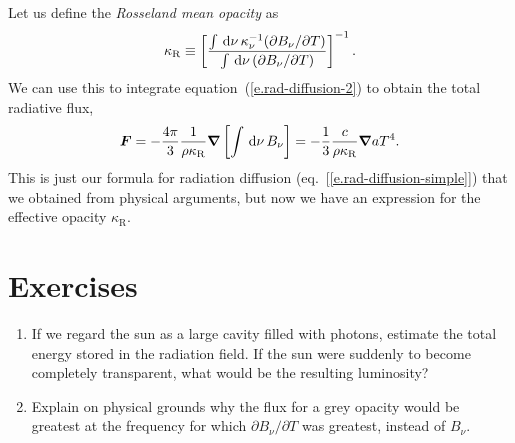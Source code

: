 Let us define the \emph{Rosseland mean opacity} as
\[ \kappa_{\mathrm{R}} \equiv \left[\frac{\int\,\mathrm{d}\nu\,\kappa_{\nu}^{-1}(\partial B_{\nu}/\partial T)}{\int \,\mathrm{d}\nu\, (\partial B_{\nu}/\partial T)}\right]^{-1}. \]
We can use this to integrate equation~(\ref{e.rad-diffusion-2}) to obtain the total radiative flux,
\begin{equation}\label{e.rad-flux}
\boldsymbol{F} = - \frac{4\pi}{3} \frac{1}{\rho\kappa_{\mathrm{R}}} \boldsymbol{\nabla}\left[\int\,\mathrm{d}\nu\,B_{\nu}\right] = - \frac{1}{3} \frac{c}{\rho\kappa_{\mathrm{R}}} \boldsymbol{\nabla} aT^{4}.
\end{equation}
This is just our formula for radiation diffusion (eq.~[\ref{e.rad-diffusion-simple}]) that we obtained from physical arguments, but now we have an expression for the effective opacity $\kappa_{\mathrm{R}}$.

\section{Exercises}
\begin{enumerate}
\item If we regard the sun as a large cavity filled with photons, estimate the total energy stored in the radiation field.  If the sun were suddenly to become completely transparent, what would be the resulting luminosity?

\item Explain on physical grounds why the flux for a grey opacity would be greatest at the frequency for which $\partial B_{\nu}/\partial T$ was greatest, instead of $B_{\nu}$.

\end{enumerate}
